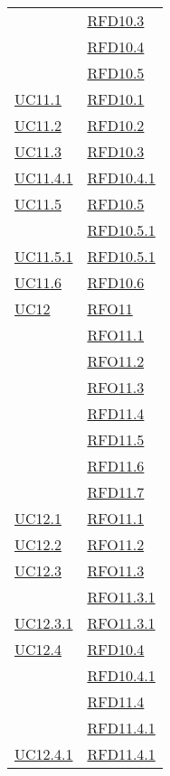 \begin{longtable}{|>{\centering}m{5cm}|m{5cm}<{\centering}|}
& \hyperlink{RFD10.3}{RFD10.3}\\
& \hyperlink{RFD10.4}{RFD10.4}\\
& \hyperlink{RFD10.5}{RFD10.5}\\ \hline
\hyperref[UC11.1]{UC11.1} & \hyperlink{RFD10.1}{RFD10.1}\\ \hline
\hyperref[UC11.2]{UC11.2} & \hyperlink{RFD10.2}{RFD10.2}\\ \hline
\hyperref[UC11.3]{UC11.3} & \hyperlink{RFD10.3}{RFD10.3}\\ \hline
\hyperref[UC11.4.1]{UC11.4.1} & \hyperlink{RFD10.4.1}{RFD10.4.1}\\ \hline
\hyperref[UC11.5]{UC11.5} & \hyperlink{RFD10.5}{RFD10.5}\\
& \hyperlink{RFD10.5.1}{RFD10.5.1}\\ \hline
\hyperref[UC11.5.1]{UC11.5.1} & \hyperlink{RFD10.5.1}{RFD10.5.1}\\ \hline
\hyperref[UC11.6]{UC11.6} & \hyperlink{RFD10.6}{RFD10.6}\\ \hline
\hyperref[UC12]{UC12} & \hyperlink{RFO11}{RFO11}\\
& \hyperlink{RFO11.1}{RFO11.1}\\
& \hyperlink{RFO11.2}{RFO11.2}\\
& \hyperlink{RFO11.3}{RFO11.3}\\
& \hyperlink{RFD11.4}{RFD11.4}\\
& \hyperlink{RFD11.5}{RFD11.5}\\
& \hyperlink{RFD11.6}{RFD11.6}\\
& \hyperlink{RFD11.7}{RFD11.7}\\ \hline
\hyperref[UC12.1]{UC12.1} & \hyperlink{RFO11.1}{RFO11.1}\\ \hline
\hyperref[UC12.2]{UC12.2} & \hyperlink{RFO11.2}{RFO11.2}\\ \hline
\hyperref[UC12.3]{UC12.3} & \hyperlink{RFO11.3}{RFO11.3}\\
& \hyperlink{RFO11.3.1}{RFO11.3.1}\\ \hline
\hyperref[UC12.3.1]{UC12.3.1} & \hyperlink{RFO11.3.1}{RFO11.3.1}\\ \hline
\hyperref[UC12.4]{UC12.4} & \hyperlink{RFD10.4}{RFD10.4}\\
& \hyperlink{RFD10.4.1}{RFD10.4.1}\\
& \hyperlink{RFD11.4}{RFD11.4}\\
& \hyperlink{RFD11.4.1}{RFD11.4.1}\\ \hline
\hyperref[UC12.4.1]{UC12.4.1} & \hyperlink{RFD11.4.1}{RFD11.4.1}\\ \hline

\end{longtable}
